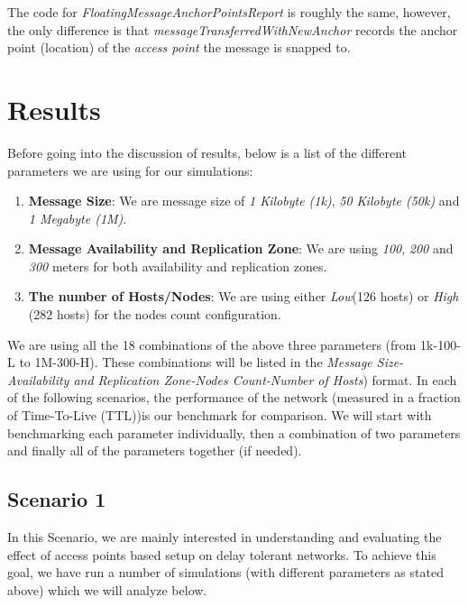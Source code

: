 The code for \textit{FloatingMessageAnchorPointsReport} is roughly the same, however, the only difference is that \textit{messageTransferredWithNewAnchor} records the anchor point (location) of the \textit{access point} the message is snapped to.


\section{Results}
Before going into the discussion of results, below is a list of the different parameters we are using for our simulations:
\begin{enumerate}
  \item \textbf{Message Size}: We are message size of \textit{1 Kilobyte (1k)}, \textit{50 Kilobyte (50k)} and \textit{1 Megabyte (1M)}.
  \item \textbf{Message Availability and Replication Zone}: We are using \textit{100}, \textit{200} and \textit{300} meters for both availability and replication zones.
  \item \textbf{The number of Hosts/Nodes}: We are using either \textit{Low}(126 hosts) or \textit{High} (282 hosts) for the nodes count configuration.
\end{enumerate}

We are using all the 18 combinations of the above three parameters (from 1k-100-L to 1M-300-H). These combinations will be listed in the \textit{Message Size-Availability and Replication Zone-Nodes Count-Number of Hosts}) format.\newline\newline
In each of the following scenarios, the performance of the network (measured in a fraction of Time-To-Live (TTL))is our benchmark for comparison. We will start with benchmarking each parameter individually, then a combination of two parameters and finally all of the parameters together (if needed).\newline

\subsection{Scenario 1}
In this Scenario, we are mainly interested in understanding and evaluating the effect of access points based setup on delay tolerant networks. To achieve this goal, we have run a number of simulations (with different parameters as stated above) which we will analyze below.

